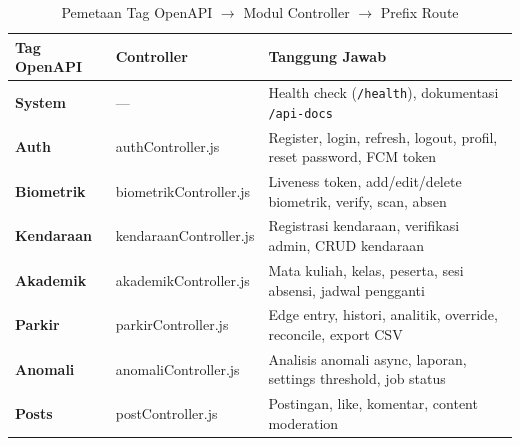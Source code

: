 \documentclass[12pt,titlepage,a4paper]{report}
\begin{document}
\begin{table}[H]
    \centering
    \caption{Pemetaan Tag OpenAPI $\rightarrow$ Modul Controller $\rightarrow$ Prefix Route}
    \small
    \renewcommand{\arraystretch}{1.2}
    \begin{tabularx}{\textwidth}{>{\bfseries}p{}>{\ttfamily}p{}Y}
        \toprule
        Tag OpenAPI & Controller & Tanggung Jawab \\
        \midrule
        System & --- & Health check (\texttt{/health}), dokumentasi \texttt{/api-docs} \\
        Auth & authController.js & Register, login, refresh, logout, profil, reset password, FCM token \\
        Biometrik & biometrikController.js & Liveness token, add/edit/delete biometrik, verify, scan, absen \\
        Kendaraan & kendaraanController.js & Registrasi kendaraan, verifikasi admin, CRUD kendaraan \\
        Akademik & akademikController.js & Mata kuliah, kelas, peserta, sesi absensi, jadwal pengganti \\
        Parkir & parkirController.js & Edge entry, histori, analitik, override, reconcile, export CSV \\
        Anomali & anomaliController.js & Analisis anomali async, laporan, settings threshold, job status \\
        Posts & postController.js & Postingan, like, komentar, content moderation \\
        \bottomrule
    \end{tabularx}
    \label{tab:tag_openapi}
\end{table}
\end{document}
